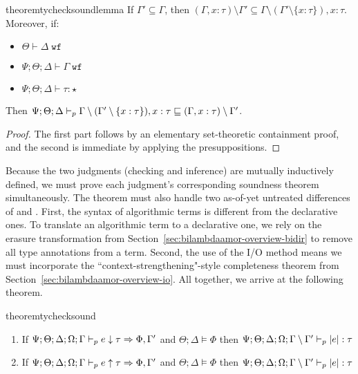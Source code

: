 \begin{restatable}{theorem}{tychecksoundlemma}
If $\Gamma' \subseteq \Gamma$, then
$(\Gamma, x : \tau) \setminus \Gamma' \subseteq \Gamma \setminus (\Gamma' \setminus \{x : \tau\}), x : \tau$. Moreover, if:
~\begin{itemize}
  \item $\Theta \vdash \Delta \; \texttt{wf}$
  \item $\Psi ; \Theta ; \Delta \vdash \Gamma \; \texttt{wf}$
  \item $\Psi ; \Theta ; \Delta \vdash \tau : \star$
\end{itemize}
Then $\Psi ; \Theta ; \Delta \vdash_p \Gamma \setminus (\Gamma' \setminus \{x : \tau\}), x : \tau \sqsubseteq (\Gamma, x : \tau) \setminus \Gamma'$.
\label{thm:tycheck-sound-lemma}
\end{restatable}
\begin{proof}
The first part follows by an elementary set-theoretic containment proof, and the second is immediate by applying the presuppositions.
\end{proof}

Because the two judgments (checking and inference) are mutually inductively defined, we must prove each judgment's corresponding soundness theorem simultaneously. The theorem must also handle two as-of-yet untreated differences of \bilambdaamor and \dlambdaamor. First, the syntax of algorithmic terms is different from the declarative ones. To translate an algorithmic term to a declarative one, we rely on the erasure transformation from Section~\ref{sec:bilambdaamor-overview-bidir} to remove all type annotations from a term. Second, the use of the I/O method means we must incorporate the ``context-strengthening"-style completeness theorem from Section~\ref{sec:bilambdaamor-overview-io}. All together, we arrive at the following theorem.

\begin{restatable}{theorem}{tychecksound}
~\begin{enumerate}
 \item If $\Psi;\Theta;\Delta;\Omega;\Gamma \vdash_p e \downarrow \tau \Rightarrow \Phi, \Gamma'$ and $\Theta;\Delta \vDash \Phi$ then $\Psi;\Theta;\Delta;\Omega;\Gamma \setminus \Gamma' \vdash_p |e| : \tau$
 \item If $\Psi;\Theta;\Delta;\Omega;\Gamma \vdash_p e \uparrow \tau \Rightarrow \Phi, \Gamma'$ and $\Theta;\Delta \vDash \Phi$ then $\Psi;\Theta;\Delta;\Omega;\Gamma \setminus \Gamma' \vdash_p |e| : \tau$
\end{enumerate}
\label{thm:tycheck-sound}
\end{restatable}

